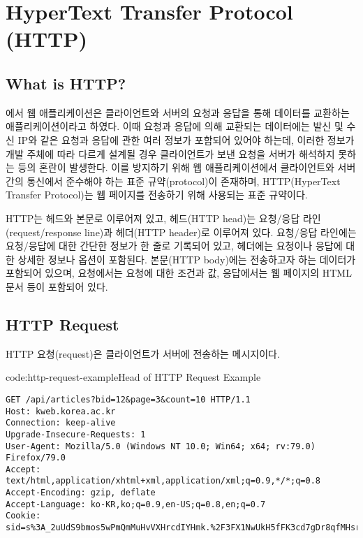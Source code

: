 \section{HyperText Transfer Protocol (HTTP)}\label{sect:hypertext-transfer-protocol}

\subsection*{What is HTTP?}

에서 웹 애플리케이션은 클라이언트와 서버의 요청과 응답을 통해 데이터를 교환하는 애플리케이션이라고 하였다. 이때 요청과 응답에 의해 교환되는 데이터에는 발신 및 수신 IP와 같은 요청과 응답에 관한 여러 정보가 포함되어 있어야 하는데, 이러한 정보가 개발 주체에 따라 다르게 설계될 경우 클라이언트가 보낸 요청을 서버가 해석하지 못하는 등의 혼란이 발생한다. 이를 방지하기 위해 웹 애플리케이션에서 클라이언트와 서버 간의 통신에서 준수해야 하는 표준 규약(protocol)이 존재하며, HTTP(HyperText Transfer Protocol)는 웹 페이지를 전송하기 위해 사용되는 표준 규약이다.

HTTP는 헤드와 본문로 이루어져 있고, 헤드(HTTP head)는 요청/응답 라인(request/response line)과 헤더(HTTP header)로 이루어져 있다. 요청/응답 라인에는 요청/응답에 대한 간단한 정보가 한 줄로 기록되어 있고, 헤더에는 요청이나 응답에 대한 상세한 정보나 옵션이 포함된다. 본문(HTTP body)에는 전송하고자 하는 데이터가 포함되어 있으며, 요청에서는 요청에 대한 조건과 값, 응답에서는 웹 페이지의 HTML 문서 등이 포함되어 있다.

\subsection*{HTTP Request}

HTTP 요청(request)은 클라이언트가 서버에 전송하는 메시지이다.

\begin{codeenv}{code:http-request-example}{Head of HTTP Request Example}\begin{verbatim}
GET /api/articles?bid=12&page=3&count=10 HTTP/1.1
Host: kweb.korea.ac.kr
Connection: keep-alive
Upgrade-Insecure-Requests: 1
User-Agent: Mozilla/5.0 (Windows NT 10.0; Win64; x64; rv:79.0) Firefox/79.0
Accept: text/html,application/xhtml+xml,application/xml;q=0.9,*/*;q=0.8
Accept-Encoding: gzip, deflate
Accept-Language: ko-KR,ko;q=0.9,en-US;q=0.8,en;q=0.7
Cookie: sid=s%3A_2uUdS9bmos5wPmQmMuHvVXHrcdIYHmk.%2F3FX1NwUkH5fFK3cd7gDr8qfMHsrvfMWGSO
\end{verbatim}
\end{codeenv}

